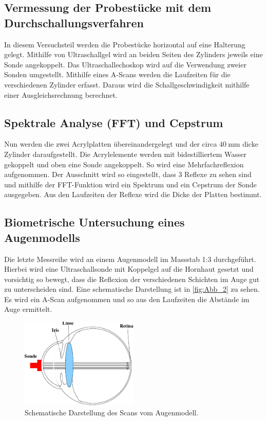 \subsection{Vermessung der Probestücke mit dem Durchschallungsverfahren}
\label{subsec:SchallDurchV_durch}

In diesem Versuchsteil werden die Probestücke horizontal auf eine Halterung gelegt. 
Mithilfe von Ultraschallgel wird an beiden Seiten des Zylinders jeweils eine Sonde angekoppelt.
Das Ultraschallechoskop wird auf die Verwendung zweier Sonden umgestellt.
Mithilfe eines A-Scans werden die Laufzeiten für die verschiedenen Zylinder erfasst.
Daraus wird die Schallgeschwindigkeit mithilfe einer Ausgleichsrechnung berechnet.

\subsection{Spektrale Analyse (FFT) und Cepstrum}
\label{subsec:FFT_durch}
Nun werden die zwei Acrylplatten übereinandergelegt und der circa $\qty{40}{\milli\meter}$ dicke Zylinder daraufgestellt. 
Die Acrylelemente werden mit bidestilliertem Wasser gekoppelt und oben eine Sonde angekoppelt.
So wird eine Mehrfachreflexion aufgenommen.
Der Ausschnitt wird so eingestellt, dass $3$ Reflexe zu sehen sind und mithilfe der FFT-Funktion wird ein Spektrum und ein Cepstrum 
der Sonde ausgegeben.
Aus den Laufzeiten der Reflexe wird die Dicke der Platten bestimmt.

\subsection{Biometrische Untersuchung eines Augenmodells}
\label{subsec:Augew1_durch}

Die letzte Messreihe wird an einem Augenmodell im Massstab 1:3 durchgeführt.
Hierbei wird eine Ultraschallsonde mit Koppelgel auf die Hornhaut gesetzt und vorsichtig so bewegt, dass die Reflexion der 
verschiedenen Schichten im Auge gut zu unterscheiden sind.
Eine schematische Darstellung ist in \autoref{fig:Abb_2} zu sehen.
Es wird ein A-Scan aufgenommen und so aus den Laufzeiten die Abstände im Auge ermittelt.
\begin{figure}[H]
    \centering
    \includegraphics[width=0.5\textwidth]{build/Abb_2.pdf}
    \caption {Schematische Darstellung des Scans vom Augenmodell\cite{VUS1}.}
    \label{fig:Abb_2}
  \end{figure}
